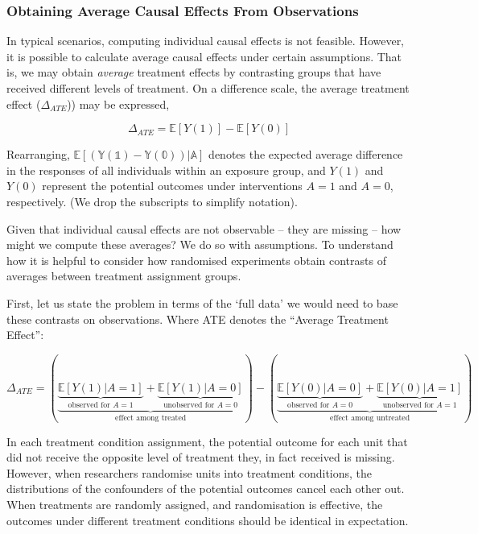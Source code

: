 \documentclass[
  singlecolumn,
  9pt]{article}
\begin{document}
\subsubsection{Obtaining Average Causal Effects From
Observations}\label{obtaining-average-causal-effects-from-observations}

In typical scenarios, computing individual causal effects is not
feasible. However, it is possible to calculate average causal effects
under certain assumptions. That is, we may obtain \emph{average}
treatment effects by contrasting groups that have received different
levels of treatment. On a difference scale, the average treatment effect
(\(\Delta_{ATE}\))) may be expressed,

\[
\Delta_{ATE}  = \mathbb{E}[Y(1)] - \mathbb{E}[Y(0)]
\]

Rearranging, \(\mathbb{E[(Y(1)-Y(0))|A]}\) denotes the expected average
difference in the responses of all individuals within an exposure group,
and \(Y(1)\) and \(Y(0)\) represent the potential outcomes under
interventions \(A = 1\) and \(A = 0\), respectively. (We drop the
subscripts to simplify notation).

Given that individual causal effects are not observable -- they are
missing -- how might we compute these averages? We do so with
assumptions. To understand how it is helpful to consider how randomised
experiments obtain contrasts of averages between treatment assignment
groups.

First, let us state the problem in terms of the `full data' we would
need to base these contrasts on observations. Where ATE denotes the
``Average Treatment Effect'':

\[
\Delta_{ATE} = \left(\underbrace{\underbrace{\mathbb{E}[Y(1)|A = 1]}_{\text{observed for } A = 1} + \underbrace{\mathbb{E}[Y(1)|A = 0]}_{\text{unobserved for } A = 0}}_{\text{effect among treated}}\right) - \left(\underbrace{\underbrace{\mathbb{E}[Y(0)|A = 0]}_{\text{observed for } A = 0} + \underbrace{\mathbb{E}[Y(0)|A = 1]}_{\text{unobserved for } A = 1}}_{\text{effect among untreated}}\right)
\]

In each treatment condition assignment, the potential outcome for each
unit that did not receive the opposite level of treatment they, in fact
received is missing. However, when researchers randomise units into
treatment conditions, the distributions of the confounders of the
potential outcomes cancel each other out. When treatments are randomly
assigned, and randomisation is effective, the outcomes under different
treatment conditions should be identical in expectation.
\end{document}
